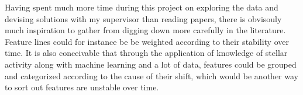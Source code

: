 Having spent much more time during this project on exploring the data and devising solutions with my supervisor than reading papers, there is obvisouly much inspiration to gather from digging down more carefully in the literature. Feature lines could for instance be be weighted according to their stability over time. It is also conceivable that through the application of knowledge of stellar activity along with machine learning and a lot of data, features could be grouped and categorized according to the cause of their shift, which would be another way to sort out features are unstable over time. 